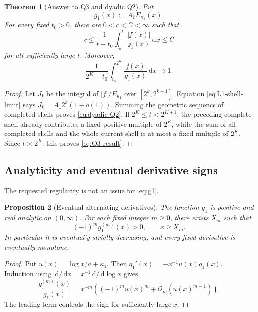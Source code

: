 \documentclass[11pt,oneside]{article}
\newtheorem{theorem}{Theorem}[section]
\newtheorem{proposition}[theorem]{Proposition}
\theoremstyle{definition}
\theoremstyle{remark}
\newcommand{\dd}{\,\mathrm d}
\newcommand{\bigO}{\mathcal O}
\begin{document}
\begin{theorem}[Answer to Q3 and dyadic Q2]
\label{thm:Q3}
Put
\begin{equation}
 g_1(x):=A_1E_{\kappa_1}(x).
 \label{eq:g1}
\end{equation}
For every fixed $t_0>0$, there are $0<c<C<\infty$ such that
\begin{equation}
 c\le
 \frac1{t-t_0}\int_{t_0}^{t}\frac{|f(x)|}{g_1(x)}\dd x
 \le C
 \label{eq:Q3-result}
\end{equation}
for all sufficiently large $t$.  Moreover,
\begin{equation}
 \frac1{2^K-t_0}\int_{t_0}^{2^K}
 \frac{|f(x)|}{g_1(x)}\dd x\longrightarrow1.
 \label{eq:dyadic-Q2}
\end{equation}
\end{theorem}

\begin{proof}
Let $J_k$ be the integral of $|f|/E_{\kappa_1}$ over
$[2^k,2^{k+1}]$.  Equation \eqref{eq:L1-shell-limit} says
$J_k=A_1 2^k(1+o(1))$.  Summing the geometric sequence of completed shells
proves \eqref{eq:dyadic-Q2}.  If $2^K\le t<2^{K+1}$, the preceding complete
shell already contributes a fixed positive multiple of $2^K$, while the sum
of all completed shells and the whole current shell is at most a fixed
multiple of $2^K$.  Since $t\asymp2^K$, this proves \eqref{eq:Q3-result}.
\end{proof}

\subsection{Analyticity and eventual derivative signs}

The requested regularity is not an issue for \eqref{eq:g1}.

\begin{proposition}[Eventual alternating derivatives]
\label{prop:derivatives}
The function $g_1$ is positive and real analytic on $(0,\infty)$.  For each
fixed integer $m\ge0$, there exists $X_m$ such that
\begin{equation}
 (-1)^m g_1^{(m)}(x)>0,
 \qquad x\ge X_m.
 \label{eq:alternating-derivatives}
\end{equation}
In particular it is eventually strictly decreasing, and every fixed
derivative is eventually monotone.
\end{proposition}

\begin{proof}
Put $u(x)=\log x/a+\kappa_1$.  Then
$g_1'(x)=-x^{-1}u(x)g_1(x)$.  Induction using
$\dd/\dd x=x^{-1}\dd/\dd\log x$ gives
\begin{equation}
 \frac{g_1^{(m)}(x)}{g_1(x)}
 =x^{-m}\left((-1)^m u(x)^m+\bigO_m(u(x)^{m-1})\right).
 \label{eq:derivative-asymptotic}
\end{equation}
The leading term controls the sign for sufficiently large $x$.
\end{proof}
\end{document}
